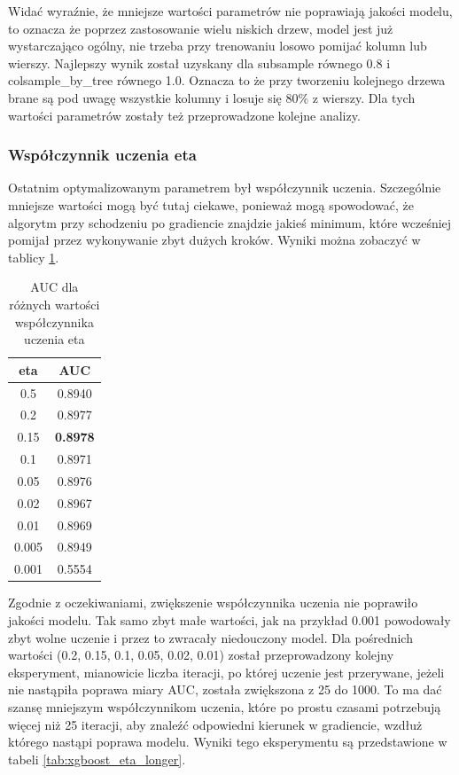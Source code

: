 \documentclass[12pt]{article}
\begin{document}
Widać wyraźnie, że mniejsze wartości parametrów nie poprawiają jakości modelu, to oznacza że poprzez zastosowanie wielu niskich drzew, model jest już wystarczająco ogólny, nie trzeba przy trenowaniu losowo pomijać kolumn lub wierszy. Najlepszy wynik został uzyskany dla subsample równego 0.8 i colsample\_by\_tree równego 1.0. Oznacza to że przy tworzeniu kolejnego drzewa brane są pod uwagę wszystkie kolumny i losuje się 80\% z wierszy. Dla tych wartości parametrów zostały też przeprowadzone kolejne analizy.

\subsubsection{Współczynnik uczenia eta}

Ostatnim optymalizowanym parametrem był współczynnik uczenia. Szczególnie mniejsze wartości mogą być tutaj ciekawe, ponieważ mogą spowodować, że algorytm przy schodzeniu po gradiencie znajdzie jakieś minimum, które wcześniej pomijał przez wykonywanie zbyt dużych kroków. Wyniki można zobaczyć w tablicy \ref{tab:xgboost_eta}.

\begin{table}[h]
    \centering
    \begin{tabular}{|c|c|}
    \hline
        eta & AUC \\ \hline
        0.5 & 0.8940 \\ \hline 
        0.2 & 0.8977 \\ \hline 
        0.15 & \textbf{0.8978} \\ \hline 
        0.1 & 0.8971 \\ \hline 
        0.05 & 0.8976 \\ \hline 
        0.02 & 0.8967 \\ \hline 
        0.01 & 0.8969 \\ \hline 
        0.005 & 0.8949 \\ \hline 
        0.001 & 0.5554 \\ \hline
    \end{tabular}
    \caption{AUC dla różnych wartości współczynnika uczenia eta}
    \label{tab:xgboost_eta}
\end{table}

Zgodnie z oczekiwaniami, zwiększenie współczynnika uczenia nie poprawiło jakości modelu. Tak samo zbyt małe wartości, jak na przykład 0.001 powodowały zbyt wolne uczenie i przez to zwracały niedouczony model. Dla pośrednich wartości (0.2, 0.15, 0.1, 0.05, 0.02, 0.01) został przeprowadzony kolejny eksperyment, mianowicie liczba iteracji, po której uczenie jest przerywane, jeżeli nie nastąpiła poprawa miary AUC, została zwiększona z 25 do 1000. To ma dać szansę mniejszym współczynnikom uczenia, które po prostu czasami potrzebują więcej niż 25 iteracji, aby znaleźć odpowiedni kierunek w gradiencie, wzdłuż którego nastąpi poprawa modelu. Wyniki tego eksperymentu są przedstawione w tabeli \ref{tab:xgboost_eta_longer}.
\end{document}

